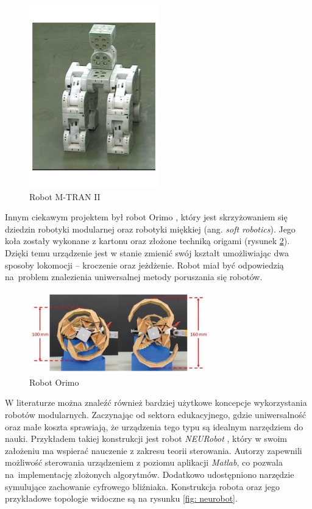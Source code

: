 \begin{figure}[ht!]
    \centering
    \includegraphics[width=0.5\textwidth]{rysunki/robots/mtran.pdf}
    \caption{\label{fig: mtran}Robot M-TRAN II \cite{mtran}}
\end{figure} 

Innym ciekawym projektem był robot Orimo \cite{chen2024}, który jest skrzyżowaniem się dziedzin robotyki modularnej oraz robotyki miękkiej (ang. \textit{soft robotics}). Jego koła zostały wykonane z kartonu oraz złożone techniką origami (rysunek \ref{fig: orimo}). Dzięki temu urządzenie jest w stanie zmienić swój kształt umożliwiając dwa sposoby lokomocji -- kroczenie oraz jeżdżenie. Robot miał być odpowiedzią na~problem znalezienia uniwersalnej metody poruszania się robotów.

\clearpage

\begin{figure}[ht!]
    \centering
    \includegraphics[width=0.7\textwidth]{rysunki/robots/orimo.pdf}
        \caption{\label{fig: orimo}Robot Orimo \cite{chen2024}}
\end{figure} 

W literaturze można znaleźć również bardziej użytkowe koncepcje wykorzystania robotów modularnych. Zaczynając od sektora edukacyjnego, gdzie uniwersalność oraz małe koszta sprawiają, że urządzenia tego typu są idealnym narzędziem do nauki. Przykładem takiej konstrukcji jest robot \textit{NEURobot} \cite{fang2009}, który w swoim założeniu ma wspierać nauczenie z zakresu teorii sterowania. Autorzy zapewnili możliwość sterowania urządzeniem z poziomu aplikacji \textit{Matlab}, co pozwala na~implementację złożonych algorytmów. Dodatkowo udostępniono narzędzie symulujące zachowanie cyfrowego bliźniaka. Konstrukcja robota oraz jego przykładowe topologie widoczne są na rysunku \ref{fig: neurobot}.

